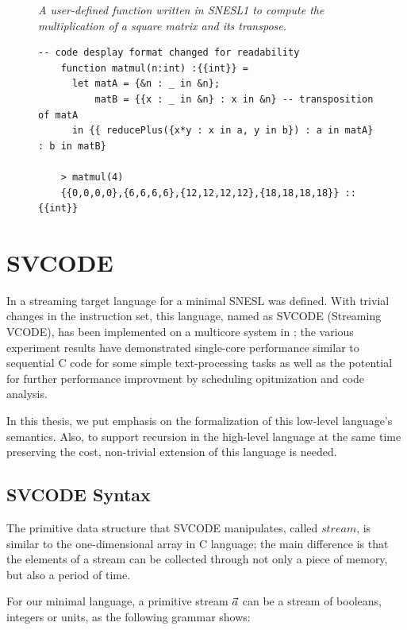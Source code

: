 \begin{figure}[H]\large
	\begin{example}\emph{A user-defined function  written in SNESL1 to compute the multiplication of a square matrix and its transpose.}
	\end{example}
	\begin{lstlisting}[style = nesl-style]
	-- code desplay format changed for readability
	function matmul(n:int) :{{int}} = 
  	  let matA = {&n : _ in &n};
	      matB = {{x : _ in &n} : x in &n} -- transposition of matA
	  in {{ reducePlus({x*y : x in a, y in b}) : a in matA} : b in matB}
	
	> matmul(4)
	{{0,0,0,0},{6,6,6,6},{12,12,12,12},{18,18,18,18}} :: {{int}}
	\end{lstlisting}
\end{figure}





\section{SVCODE}
In \cite{Fmaster} a streaming target language for a minimal SNESL was defined.
With trivial changes in the instruction set, this language, named as SVCODE (Streaming VCODE), has been implemented on a multicore system in \cite{Fphd}; the various experiment results
have demonstrated single-core performance similar to sequential C code for some simple 
text-processing tasks as well as the
potential for further performance improvment by scheduling opitmization and code analysis.

In this thesis, we put emphasis on the formalization of this low-level language's semantics.
Also, to support recursion in the high-level language at the same time preserving the cost, non-trivial extension of this language is needed. 

\subsection{SVCODE Syntax}
The primitive data structure that SVCODE manipulates, called $stream$, is similar to the one-dimensional array in C language; the main difference is that the elements of a stream can
be collected through not only a piece of memory, but also a period of time. 


For our minimal language, a primitive stream $\vec a$ can be a stream of booleans, integers or units, as the following grammar shows:

